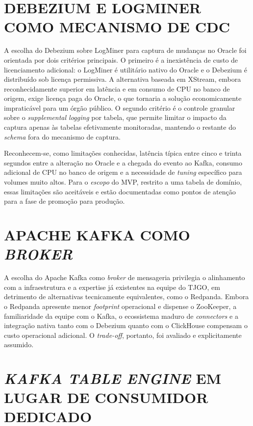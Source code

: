 \documentclass[12pt,letterpaper,oneside]{report}
\begin{document}
\section{DEBEZIUM E LOGMINER COMO MECANISMO DE CDC}

A escolha do Debezium sobre LogMiner para captura de mudanças no Oracle foi orientada por dois critérios principais. O primeiro é a inexistência de custo de licenciamento adicional: o LogMiner é utilitário nativo do Oracle e o Debezium é distribuído sob licença permissiva. A alternativa baseada em XStream, embora reconhecidamente superior em latência e em consumo de CPU no banco de origem, exige licença paga do Oracle, o que tornaria a solução economicamente impraticável para um órgão público. O segundo critério é o controle granular sobre o \textit{supplemental logging} por tabela, que permite limitar o impacto da captura apenas às tabelas efetivamente monitoradas, mantendo o restante do \textit{schema} fora do mecanismo de captura.

Reconhecem-se, como limitações conhecidas, latência típica entre cinco e trinta segundos entre a alteração no Oracle e a chegada do evento ao Kafka, consumo adicional de CPU no banco de origem e a necessidade de \textit{tuning} específico para volumes muito altos. Para o \textit{escopo} do MVP, restrito a uma tabela de domínio, essas limitações são aceitáveis e estão documentadas como pontos de atenção para a fase de promoção para produção.

\section{APACHE KAFKA COMO \textit{BROKER}}

A escolha do Apache Kafka como \textit{broker} de mensageria privilegia o alinhamento com a infraestrutura e a expertise já existentes na equipe do TJGO, em detrimento de alternativas tecnicamente equivalentes, como o Redpanda. Embora o Redpanda apresente menor \textit{footprint} operacional e dispense o ZooKeeper, a familiaridade da equipe com o Kafka, o ecossistema maduro de \textit{connectors} e a integração nativa tanto com o Debezium quanto com o ClickHouse compensam o custo operacional adicional. O \textit{trade-off}, portanto, foi avaliado e explicitamente assumido.

\section{\textit{KAFKA TABLE ENGINE} EM LUGAR DE CONSUMIDOR DEDICADO}
\end{document}
